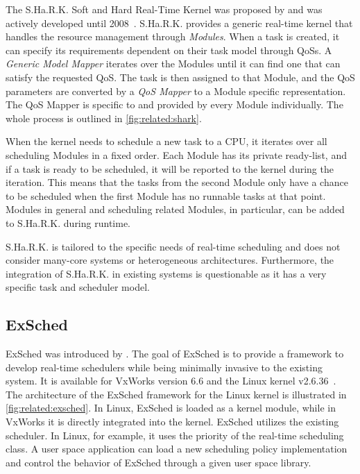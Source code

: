 The S.Ha.R.K. Soft and Hard Real-Time Kernel was proposed by \textcite{Gai-2001-SHaRK} and was actively developed until 2008~\cite{SHaRK}. S.Ha.R.K. provides a generic real-time kernel that handles the resource management through \emph{Modules}. When a task is created, it can specify its requirements dependent on their task model through \acp{QoS}. A \emph{Generic Model Mapper} iterates over the Modules until it can find one that can satisfy the requested \ac{QoS}. The task is then assigned to that Module, and the \ac{QoS} parameters are converted by a \emph{\ac{QoS} Mapper} to a Module specific representation. The \ac{QoS} Mapper is specific to and provided by every Module individually. The whole process is outlined in \cref{fig:related:shark}.

When the kernel needs to schedule a new task to a CPU, it iterates over all scheduling Modules in a fixed order. Each Module has its private ready-list, and if a task is ready to be scheduled, it will be reported to the kernel during the iteration. This means that the tasks from the second Module only have a chance to be scheduled when the first Module has no runnable tasks at that point. Modules in general and scheduling related Modules, in particular, can be added to S.Ha.R.K. during runtime.

S.Ha.R.K. is tailored to the specific needs of real-time scheduling and does not consider many-core systems or heterogeneous architectures. Furthermore, the integration of S.Ha.R.K. in existing systems is questionable as it has a very specific task and scheduler model.

\subsection{ExSched}%
\label{sec:rw:exsched}

ExSched was introduced by \textcite{Asberg-2012-ExSched}. The goal of ExSched is to provide a framework to develop real-time schedulers while being minimally invasive to the existing system. It is available for VxWorks version 6.6 and the Linux kernel v2.6.36~\cite{ExSched}. The architecture of the ExSched framework for the Linux kernel is illustrated in \cref{fig:related:exsched}. In Linux, ExSched is loaded as a kernel module, while in VxWorks it is directly integrated into the kernel. ExSched utilizes the existing scheduler. In Linux, for example, it uses the  priority of the real-time scheduling class. A user space application can load a new scheduling policy implementation and control the behavior of ExSched through a given user space library.

